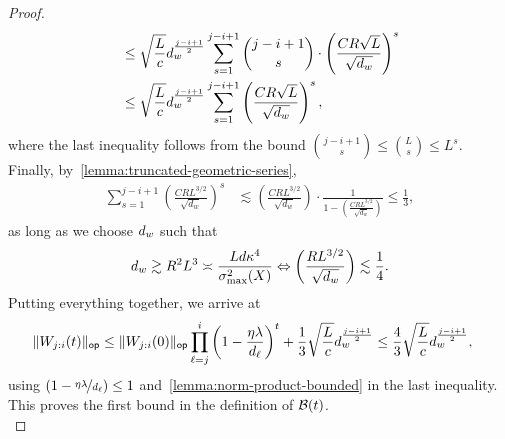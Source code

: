 \begin{proof}
\begin{align*}
      & \leq
       \sqrt{\frac{L}{c}} d_{w}^{\frac{ j - i + 1 }{2}}
      \sum_{s = 1}^{j - i + 1} \binom{j - i + 1}{s} \cdot \left( \frac{C R \sqrt{L}}{\sqrt{d_w}} 
     \right)^{s}  \\
      &\leq
       \sqrt{\frac{L}{c}} d_{w}^{\frac{j - i + 1}{2}}
      \sum_{s = 1}^{j - i + 1}
     \left( \frac{C R \sqrt{L}}{\sqrt{d_w}} 
     \right)^{s} ,
  \end{align*}
  where the last inequality follows from the bound
  \(
    \binom{j - i + 1}{s} \leq \binom{L}{s} \leq L^{s}.
  \)
  Finally, by~\cref{lemma:truncated-geometric-series},
  \begin{align*}
    \sum_{s = 1}^{j - i + 1}
     \left( \frac{C R L^{3/2}}{\sqrt{d_w}} 
     \right)^{s} 
    & \lesssim
    \left( \frac{C R L^{3/2}}{\sqrt{d_w}} 
     \right) \cdot
    \frac{1}{1 -\left( \frac{C RL^{3/2}}{\sqrt{d_w}} 
     \right) }
    \leq \frac{1}{3},
  \end{align*}
  as long as we choose $d_{w}$ such that
  \[
    d_{w} \gtrsim R^2 L^{3} \asymp
    \frac{L d \kappa^4}{\sigma_{\max}^2(X)}
    \Leftrightarrow
    \left( \frac{ R L^{3/2}}{\sqrt{d_w}} 
     \right) \lesssim \frac{1}{4}.
  \]
  Putting everything together, we arrive at
  \begin{align*}
    \lVert W_{j:i}(t)\rVert_{\mathsf{op}} & \leq
    \lVert W_{j:i}(0)\rVert_{\mathsf{op}} \prod_{\ell = j}^{i} \left(1 - \frac{\eta \lambda}{d_{\ell}}\right)^{t}
    + \frac{1}{3} \sqrt{\frac{L}{c}} d_{w}^{\frac{j - i + 1}{2}} \leq
    \frac{4}{3} \sqrt{\frac{L}{c}} d_{w}^{\frac{j - i + 1}{2}},
  \end{align*}
  using $(1 - \nicefrac{\eta \lambda}{d_{\ell}}) \leq 1$ and~\cref{lemma:norm-product-bounded} in the last inequality. This proves the
  first bound in the definition of $\mathcal{B}(t)$. \\

\end{proof}
